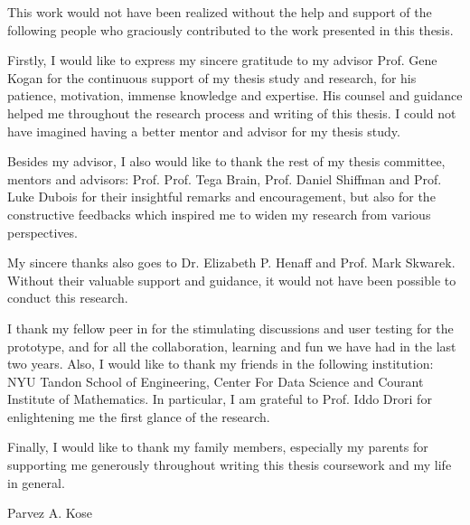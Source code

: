 %
%
%
%
%

\begin{acknowledgments} 

This work would not have been realized without the help and support of the following people who graciously contributed to the work presented in this thesis.

Firstly, I would like to express my sincere gratitude to my advisor Prof. Gene Kogan for the continuous support of my thesis study and research, for his patience, motivation, immense knowledge and expertise. His counsel and guidance helped me throughout the research process and writing of this thesis. I could not have imagined having a better mentor and advisor for my thesis study.

Besides my advisor, I also would like to thank the rest of my thesis committee, mentors and advisors: Prof. Prof. Tega Brain, Prof. Daniel Shiffman and Prof. Luke Dubois for their insightful remarks and encouragement, but also for the constructive feedbacks which inspired me to widen my research from various perspectives.

My sincere thanks also goes to Dr. Elizabeth P. Henaff and Prof. Mark Skwarek. Without their valuable support and guidance, it would not have been possible to conduct this research.

I thank my fellow peer in for the stimulating discussions and user testing for the prototype, and for all the collaboration, learning and fun we have had in the last two years. Also, I would like to thank my friends in the following institution: NYU Tandon School of Engineering, Center For Data Science and Courant Institute of Mathematics. In particular, I am grateful to Prof. Iddo Drori for enlightening me the first glance of the research.

Finally, I would like to thank my family members, especially my parents for supporting me generously throughout writing this thesis coursework and my life in general.

\begin{flushright} 
Parvez A. Kose
\end{flushright}
\end{acknowledgments}

